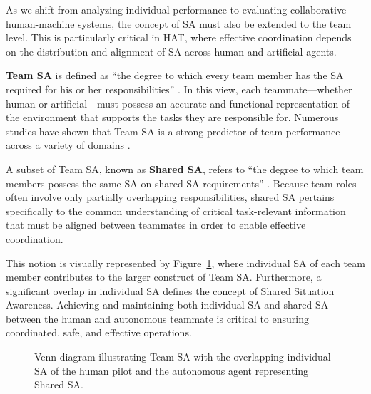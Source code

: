 \documentclass[12pt,a4paper]{article} %
\begin{document}
	As we shift from analyzing individual performance to evaluating collaborative human-machine systems, the concept of SA must also be extended to the team level. This is particularly critical in HAT, where effective coordination depends on the distribution and alignment of SA across human and artificial agents.

	\textbf{Team SA} is defined as “the degree to which every team member has the SA required for his or her responsibilities” \parencite{endsley_measurement_1995}. In this view, each teammate—whether human or artificial—must possess an accurate and functional representation of the environment that supports the tasks they are responsible for. Numerous studies have shown that Team SA is a strong predictor of team performance across a variety of domains \parencite{cooke_measuring_2001,prince_measurement_2007,parush_individuals_2017}.

	A subset of Team SA, known as \textbf{Shared SA}, refers to “the degree to which team members possess the same SA on shared SA requirements” \parencite{endsley_designing_2003}. Because team roles often involve only partially overlapping responsibilities, shared SA pertains specifically to the common understanding of critical task-relevant information that must be aligned between teammates in order to enable effective coordination.

	This notion is visually represented by Figure~\ref{fig:team-sa-venn}, where individual SA of each team member contributes to the larger construct of Team SA. Furthermore, a significant overlap in individual SA defines the concept of Shared Situation Awareness. Achieving and maintaining both individual SA and shared SA between the human and autonomous teammate is critical to ensuring coordinated, safe, and effective operations.

	\begin{figure}[h!]
		\centering
		\caption{Venn diagram illustrating Team SA with the overlapping individual SA of the human pilot and the autonomous agent representing Shared SA.}
		\label{fig:team-sa-venn}
	\end{figure}
\end{document}
